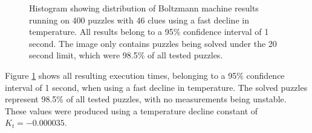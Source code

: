 \documentclass[a4paper,11pt]{kth-mag}
\begin{document}
\begin{figure}[here] 
\noindent{}
\vspace{-15pt}
\caption[Histogram with distribution of Boltzmann machine with fast decline]{Histogram showing distribution of Boltzmann machine results running on 400 puzzles with 46 clues using a fast decline in temperature. All results belong to a 95\% confidence interval of 1 second. The image only contains puzzles being solved under the 20 second limit, which were 98.5\% of all tested puzzles.}
\label{fig:boltzmannFast}
\end{figure}

Figure \ref{fig:boltzmannFast} shows all resulting execution times, belonging to a 95\% confidence interval of 1 second, when using a fast decline in temperature.
The solved puzzles represent 98.5\% of all tested puzzles, with no measurements being unstable.
These values were produced using a temperature decline constant of $K_t = -0.000035$.
\end{document}
